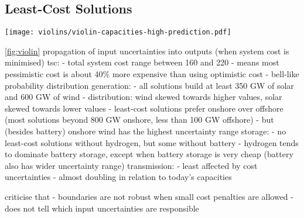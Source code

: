 \subsection{Least-Cost Solutions}

\begin{SCfigure}
    \texttt{[image: violins/violin-capacities-high-prediction.pdf]}
    \caption{Lorem ipsum dolor sit amet, consetetur sadipscing elitr, sed diam nonumy eirmod tempor invidunt ut labore et dolore magna aliquyam erat, sed diam voluptua.}
    \label{fig:violin}
\end{SCfigure}

\cref{fig:violin} propagation of input uncertainties into outputs (when system cost is minimised)
tsc:
- total system cost range between 160 and 220
- means most pessimistic cost is about 40\% more expensive than using optimistic cost
- bell-like probability distribution
generation:
- all solutions build at least 350 GW of solar and 600 GW of wind
- distribution: wind skewed towards higher values, solar skewed towards lower values
- least-cost solutions prefer onshore over offshore (most solutions beyond 800 GW onshore, less than 100 GW offshore)
- but (besides battery) onshore wind has the highest uncertainty range
storage:
- no least-cost solutions without hydrogen, but some without battery
- hydrogen tends to dominate battery storage, except when battery storage is very cheap (battery also has wider uncertainty range)
transmission:
- least affected by cost uncertainties
- almost doubling in relation to today's capacities

criticise that
- boundaries are not robust when small cost penalties are allowed
- does not tell which input uncertainties are responsible


